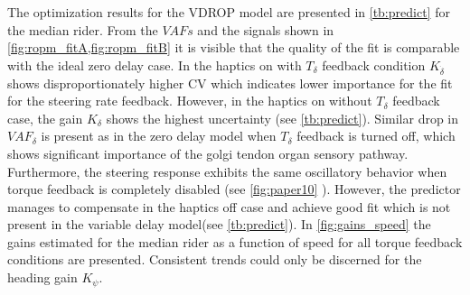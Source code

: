 The optimization results for the VDROP model are presented in \cref{tb:predict} for the median rider. From the \ensuremath{\mathit{VAF}s} and the signals shown in \cref{fig:ropm_fitA,fig:ropm_fitB} it is visible that the quality of the fit is comparable with the ideal zero delay case. In the haptics on with \ensuremath{{T_\delta}} feedback condition \ensuremath{K_{\dot{\delta}}} shows disproportionately higher CV which indicates lower importance for the fit for the steering rate feedback. However, in the haptics on without \ensuremath{ {T_\delta}} feedback case, the gain \ensuremath{K_{\delta}} shows the highest  uncertainty (see \cref{tb:predict}). Similar drop in \ensuremath{\mathit{VAF}_\delta} is present as in the zero delay model when  \ensuremath{{T_\delta}} feedback is turned off, which shows significant importance of the golgi tendon organ sensory pathway. Furthermore, the steering response exhibits  the same oscillatory behavior when torque feedback is completely disabled (see \cref{fig:paper10} ). However, the predictor manages to compensate in the haptics off case and achieve good fit which is not present in the variable delay model(see \cref{tb:predict}). In \cref{fig:gains_speed} the gains estimated for the median rider as a function of speed for all torque feedback conditions are presented. Consistent trends could only be discerned for the heading  gain \ensuremath{K_\psi}.

